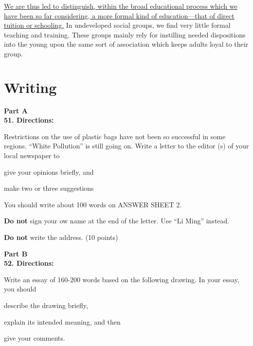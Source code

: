 \transnum \uline{We are thus led to distinguish, within the broad
educational process which we have been so far considering, a more formal
kind of education---that of direct tuition or
schooling.} In undeveloped social groups, we find very little formal
teaching and training. These groups mainly rely for instilling needed
dispositions into the young upon the same sort of association which
keeps adults loyal to their group.



\newpage

\section{Writing}


\noindent
\textbf{Part A}\\
\textbf{51. Directions:}

Restrictions on the use of plastic bags have not been so successful in
some regions. ``White Pollution'' is still going on.
Write a letter to the editor (s) of your local newspaper to
\begin{listwrite}
	\item
give your opinions briefly, and

\item 
 make two or three suggestions
\end{listwrite}

You should write about 100 words on ANSWER SHEET 2.

\textbf{Do not} sign your ow name at the end of the letter. Use ``Li Ming'' instead. 

\textbf{Do not} write the
address. (10 points)


\vspace{2em}

\noindent
\textbf{Part B}\\
\textbf{52. Directions:}

Write an essay of 160-200 words based on the following drawing. In your
essay, you should
\begin{listwrite}
	\item
 describe the drawing briefly,

\item 
 explain its intended meaning, and then

\item 
 give your comments.
\end{listwrite}

